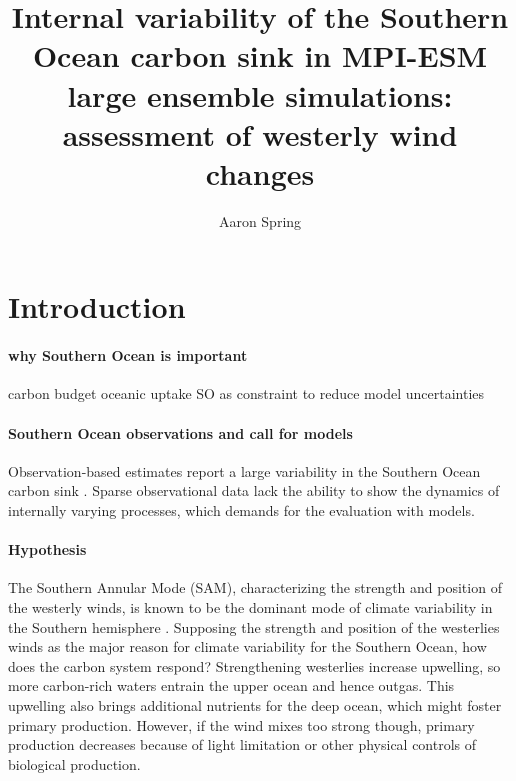 \documentclass[12pt]{article}
\author{Aaron Spring}
\begin{document}
 


\baselineskip24pt

\title{Internal variability of the Southern Ocean carbon sink in MPI-ESM large ensemble simulations: \\ assessment of westerly wind changes}

\maketitle 

\normalsize
\tableofcontents

\newpage

\section{Introduction}

\paragraph{why Southern Ocean is important} carbon budget oceanic uptake \citep{Sabine2004} \citep{Quere2016a} SO as constraint to reduce model uncertainties \citep{Kessler2016}

\paragraph{Southern Ocean observations and call for models}
Observation-based estimates report a large variability in the Southern Ocean carbon sink \citep{LeQuere2007,landschuetzer2015}. Sparse observational data lack the ability to show the dynamics of internally varying processes, which demands for the evaluation with models.
 
 
 
\paragraph{Hypothesis}
The Southern Annular Mode (SAM), characterizing the strength and position of the westerly winds, is known to be the dominant mode of climate variability in the Southern hemisphere \citep{Thompson2000}.  Supposing the strength and position of the westerlies winds as the major reason for climate variability for the Southern Ocean, how does the carbon system respond? Strengthening westerlies increase upwelling, so more carbon-rich waters entrain the upper ocean and hence outgas. This upwelling also brings additional nutrients for the deep ocean, which might foster primary production. However, if the wind mixes too strong though, primary production decreases because of light limitation \citep{Sverdrup1953} or other physical controls of biological production.
\end{document}
